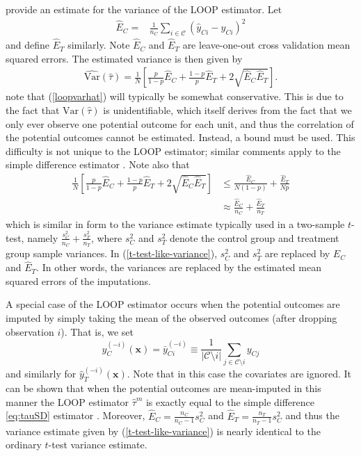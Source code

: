 \cite{loop} provide an estimate for the variance of the LOOP estimator.  Let
\begin{align}
\hat{E}_C = & \frac{1}{n_C}\sum_{i \in \mathcal{C}}(\hat{y}_{Ci} - y_{Ci})^2 \label{Echat}
\end{align}
and define $\hat{E}_T$ similarly.  Note $\hat{E}_C$ and $\hat{E}_T$ are leave-one-out cross validation mean squared errors.  The estimated variance is then given by
\begin{align}
\widehat{\mathrm{Var}}(\hat{\tau}) =  \frac{1}{N}\left[\frac{p}{1-p}\hat{E}_C + \frac{1-p}{p}\hat{E}_T + 2\sqrt{\hat{E}_C\hat{E}_T}\right]. \label{loopvarhat}
\end{align}
\cite{loop} note that (\ref{loopvarhat}) will typically be somewhat conservative.  This is due to the fact that $\mathrm{Var}(\hat{\tau})$ is unidentifiable, which itself derives from the fact that we only ever observe one potential outcome for each unit, and thus the correlation of the potential outcomes cannot be estimated.  Instead, a bound must be used.  This difficulty is not unique to the LOOP estimator; similar comments apply to the simple difference estimator \citep{aronow2014}.  Note also that
\begin{align}
\frac{1}{N}\left[\frac{p}{1-p}\hat{E}_C + \frac{1-p}{p}\hat{E}_T + 2\sqrt{\hat{E}_C\hat{E}_T}\right]
&\le
\frac{\hat{E}_C}{N(1-p)} + \frac{\hat{E}_T}{Np} \\
&\approx
\frac{\hat{E}_C}{n_C} + \frac{\hat{E}_T}{n_T} \label{t-test-like-variance}
\end{align}
which is similar in form to the variance estimate typically used in a two-sample $t$-test, namely $\frac{s^2_C}{n_C} + \frac{s^2_T}{n_T}$, where $s^2_C$ and $s^2_T$ denote the control group and treatment group sample variances.  In (\ref{t-test-like-variance}), $s^2_C$ and $s^2_T$ are replaced by $\hat{E}_C$ and $\hat{E}_T$.  In other words, the variances are replaced by the estimated mean squared errors of the imputations.

A special case of the LOOP estimator occurs when the potential outcomes are imputed by simply taking the mean of the observed  outcomes (after dropping observation $i$).  That is, we set
\begin{equation}
\hat{y}^{(-i)}_C(\mathbf{x}) = \bar{y}^{(-i)}_{Ci}\equiv \frac{1}{|{\mathcal{C}\setminus i}|}\sum_{j \in \mathcal{C} \setminus i} y_{Cj}
\end{equation}
and similarly for $\hat{y}^{(-i)}_T(\mathbf{x})$.  Note that in this
case the covariates are ignored.  It can be shown that when the
potential outcomes are mean-imputed in this manner the LOOP estimator
$\hat{\tau}^{m}$ is exactly equal to the simple difference
\eqref{eq:tauSD} estimator
\citep{loop}.  Moreover, $\hat{E}_C = \frac{n_C}{n_C-1}s^2_C$ and $\hat{E}_T = \frac{n_T}{n_T-1}s^2_C$ and thus the variance estimate given by (\ref{t-test-like-variance}) is nearly identical to the ordinary $t$-test variance estimate.

